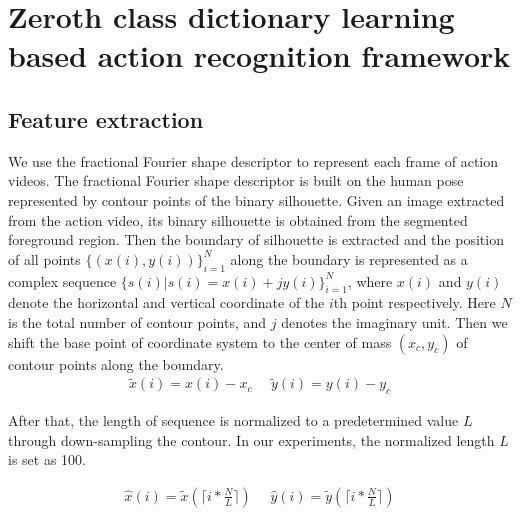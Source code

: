 \documentclass{article}
\begin{document}
\section{Zeroth class dictionary learning based action recognition framework}

\subsection{Feature extraction}

We use the fractional Fourier shape descriptor \cite{frftacpr2015}  to represent each frame of action videos.
The fractional Fourier shape descriptor is built on the human pose represented by contour points of the binary silhouette.
Given an image extracted from the action video, its binary silhouette is obtained from the segmented foreground region.
Then the boundary of silhouette is extracted
 and the position of all points $\{(x(i),y(i))\}_{i=1}^{N}$ along the boundary is represented as a complex sequence $\{s(i)|s(i)=x(i)+jy(i)\}_{i=1}^{N}$, where $x(i)$ and $y(i)$ denote  the horizontal and vertical coordinate of the $i$th point respectively. Here $N$ is the total number of contour points, and $j$ denotes the imaginary unit.
Then we shift the base point of coordinate system to the center of mass $(x_{c},y_{c})$ of contour points along the boundary.
\begin{equation} \label{eq5}
 \begin{aligned}
\tilde{x}(i)=x(i)-x_{c} \ \ \ \ \ \  \tilde{y}(i)=y(i)-y_{c}
 \end{aligned}
\end{equation}

After that, the length of sequence is normalized to a predetermined value $L$ through down-sampling the contour.
In our experiments, the normalized length $L$ is set as 100.

 \begin{equation} \label{eq5}
 \begin{aligned}
\hat{x}(i)=\tilde{x}(\lceil i*\frac{N}{L} \rceil)  \ \ \ \ \ \  \hat{y}(i)=\tilde{y}(\lceil i*\frac{N}{L} \rceil)
\end{aligned}
\end{equation}
\end{document}
